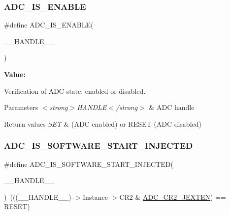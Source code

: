 \subsubsection{\texorpdfstring{ADC\_IS\_ENABLE}{ADC\_IS\_ENABLE}}
{\footnotesize\ttfamily \#define A\+D\+C\+\_\+\+I\+S\+\_\+\+E\+N\+A\+B\+LE(\begin{DoxyParamCaption}\item[{}]{\+\_\+\+\_\+\+H\+A\+N\+D\+L\+E\+\_\+\+\_\+ }\end{DoxyParamCaption})}

{\bfseries Value\+:}
\begin{DoxyCode}{0}

\end{DoxyCode}


Verification of A\+DC state\+: enabled or disabled. 


\begin{DoxyParams}{Parameters}
{\em $<$strong$>$\+H\+A\+N\+D\+L\+E$<$/strong$>$} & A\+DC handle \\
\hline
\end{DoxyParams}

\begin{DoxyRetVals}{Return values}
{\em S\+ET} & (A\+DC enabled) or R\+E\+S\+ET (A\+DC disabled) \\
\hline
\end{DoxyRetVals}
\mbox{\label{group___a_d_c___private___macros_gaa3a1c2197a097b9bb8159b6eb1ac8941}} 
\subsubsection{\texorpdfstring{ADC\_IS\_SOFTWARE\_START\_INJECTED}{ADC\_IS\_SOFTWARE\_START\_INJECTED}}
{\footnotesize\ttfamily \#define A\+D\+C\+\_\+\+I\+S\+\_\+\+S\+O\+F\+T\+W\+A\+R\+E\+\_\+\+S\+T\+A\+R\+T\+\_\+\+I\+N\+J\+E\+C\+T\+ED(\begin{DoxyParamCaption}\item[{}]{\+\_\+\+\_\+\+H\+A\+N\+D\+L\+E\+\_\+\+\_\+ }\end{DoxyParamCaption})~(((\+\_\+\+\_\+\+H\+A\+N\+D\+L\+E\+\_\+\+\_\+)-\/$>$Instance-\/$>$C\+R2 \& \mbox{\hyperlink{group___peripheral___registers___bits___definition_ga07330f702208792faca3a563dc4fd9c6}{A\+D\+C\+\_\+\+C\+R2\+\_\+\+J\+E\+X\+T\+EN}}) == R\+E\+S\+ET)}




